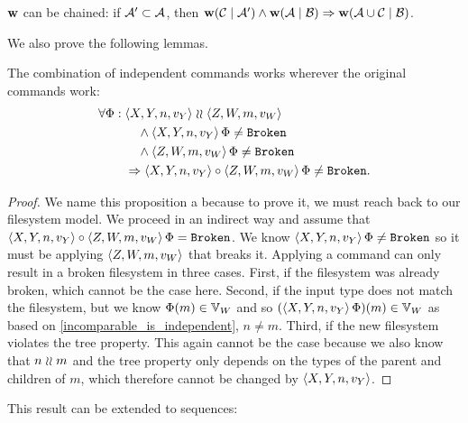 \begin{mycor}\label{workschained}
$\mathbf{w}$ can be chained:
if $\mathcal{A'}\subset\mathcal{A}$, then
$ \mathbf{w}({\mathcal{C}}\mathrel{|}{\mathcal{A'}}) \wedge \mathbf{w}({\mathcal{A}}\mathrel{|}{\mathcal{B}}) \Rightarrow \mathbf{w}({\mathcal{A}\cup\mathcal{C}}\mathrel{|}{\mathcal{B}})$.
\end{mycor}

We also prove the following lemmas.

\begin{myax}\label{combine_independent_commands}
The combination of independent commands works wherever the original commands work:
\begin{align*}
\forall\Phi:{}&\langle{X,Y,n,v_Y}\rangle\mathrel{\wr\wr} \langle{Z,W,m,v_W}\rangle \\
&\quad\wedge \langle{X,Y,n,v_Y}\rangle\,\Phi\neq\mathtt{Broken} \\
&\quad\wedge \langle{Z,W,m,v_W}\rangle\,\Phi\neq\mathtt{Broken} \\
&\Rightarrow \langle{X,Y,n,v_Y}\rangle\circ \langle{Z,W,m,v_W}\rangle\,\Phi\neq\mathtt{Broken}.
\end{align*}
\end{myax}
\begin{proof}
We name this proposition a  
because to prove it, we must reach back to our filesystem model.
We proceed in an indirect way and
assume that $\langle{X,Y,n,v_Y}\rangle\circ \langle{Z,W,m,v_W}\rangle\,\Phi=\mathtt{Broken}$.
We know $\langle{X,Y,n,v_Y}\rangle\,\Phi\neq\mathtt{Broken}$ so it must be applying 
$\langle{Z,W,m,v_W}\rangle$ that breaks it.
Applying a command can only result in a broken filesystem in three cases.
First, if the filesystem was already broken, which cannot be the case here.
Second, if the input type does not match the filesystem,
but we know $\Phi(m)\in\mathbb{V}_{W}$ and so
$(\langle{X,Y,n,v_Y}\rangle\,\Phi)(m)\in\mathbb{V}_{W}$ as based on \cref{incomparable_is_independent}, $n\neq m$.
Third, if the new filesystem violates the tree property.
This again cannot be the case because we also know that $n\mathrel{\wr\wr} m$
and the tree property only depends on the types of the parent and children of $m$,
which therefore cannot be changed by $\langle{X,Y,n,v_Y}\rangle$.
\end{proof}

This result can be extended to sequences:

